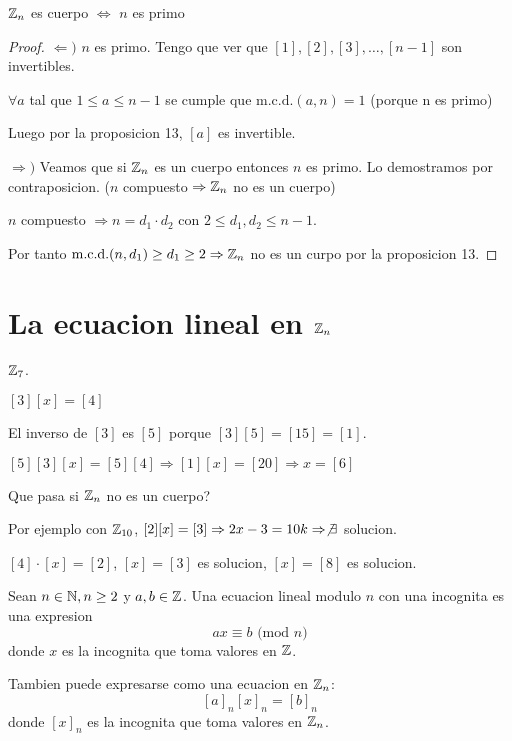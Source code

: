 \begin{proposition}
	\(\mathbb{Z}_n \) es cuerpo \(\iff  \) \(n \) es primo
\end{proposition}

\begin{proof}
	\(\Leftarrow ) \) \(n \) es primo. Tengo que ver que \([1],[2],[3],\ldots,[n-1 ]\) son invertibles.
	
	\(\forall  a \) tal que \(1 \leq a \leq n - 1 \) se cumple que \(\mathrm{m.c.d.}(a,n) = 1 \) (porque n es primo)
	
	Luego por la proposicion 13, \([a ]\) es invertible.
	
	\(\Rightarrow ) \) Veamos que si \(\mathbb{Z}_n \) es un cuerpo entonces \(n \) es primo. Lo demostramos por contraposicion. (\(n \) compuesto \(\Rightarrow \mathbb{Z}_n \) no es un cuerpo)
	
	\(n \) compuesto \(\Rightarrow n = d_1 \cdot d_2 \) con \(2 \leq d_1, d_2 \leq n - 1\).
	
	Por tanto \(\mathrm{m.c.d.}(n,d_1) \geq d_1 \geq 2 \Rightarrow \mathbb{Z}_n \) no es un curpo por la proposicion 13.
\end{proof}

\section{La ecuacion lineal en \(\mathbb{Z}_n \)}
\begin{example}
	\(\mathbb{Z}_7 \).
	
	\([3][x] = [4]\)
	
	El inverso de \([3]\) es \([5]\) porque \([3][5] = [15] = [1]\).
	
	\([5][3][x] = [5][4] \Rightarrow [1][x] = [20] \Rightarrow x = [6]\)
\end{example}
\begin{remark}
	Que pasa si \(\mathbb{Z}_n \) no es un cuerpo?
	
	Por ejemplo con \(\mathbb{Z}_{10 }\), \([2][x]=[3] \Rightarrow 2x - 3 = 10k \Rightarrow \not \exists \) solucion.
	
	\([4] \cdot [x] = [2]\), \([x]  = [3 ]\) es solucion, \([x] = [8 ]\) es solucion.
\end{remark}

\begin{definition}
	Sean \(n \in \mathbb{N}, n \geq 2 \) y \(a,b \in \mathbb{Z} \). Una ecuacion lineal modulo \( n \) con una incognita es una expresion
	\[
		ax \equiv b \text{ (mod }  n)
	\]
	donde \(x \) es la incognita que toma valores en \(\mathbb{Z} \).
	
	Tambien puede expresarse como una ecuacion en \(\mathbb{Z}_n \):
	\[
		[a]_n [x]_n = [b]_n
	\]
	donde \([x]_n \) es la incognita que toma valores en \(\mathbb{Z}_n \).
\end{definition}

